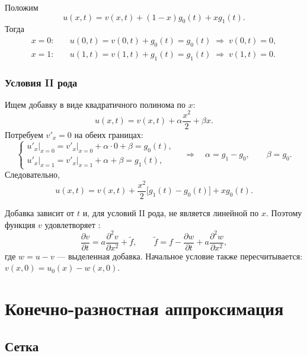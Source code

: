 \documentclass[../final.tex]{subfiles}
\begin{document}
Положим
\begin{equation*}
    u(x,t)=v(x,t)+(1-x)g_0(t)+xg_1(t).
\end{equation*}
Тогда
\begin{align*}
    x=0:&\quad u(0,t)=v(0,t)+g_0(t)=g_0(t)
    \;\Longrightarrow\; v(0,t)=0,\\
    x=1:&\quad u(1,t)=v(1,t)+g_1(t)=g_1(t)
    \;\Longrightarrow\; v(1,t)=0.
\end{align*}

\subsubsection{Условия II рода}

Ищем добавку в виде квадратичного полинома по $x$:
\begin{equation*}
    u(x,t)=v(x,t)+\alpha\frac{x^2}{2}+\beta x.
\end{equation*}
Потребуем $v'_x=0$ на обеих границах:
\begin{equation*}
    \begin{cases}
        u'_x\big|_{x=0}=v'_x\big|_{x=0}+\alpha\cdot0+\beta=g_0(t),\\
        u'_x\big|_{x=1}=v'_x\big|_{x=1}+\alpha+\beta=g_1(t),
    \end{cases}
    \quad\Longrightarrow\quad
    \alpha=g_1-g_0,\qquad\beta=g_0.
\end{equation*}
Следовательно,
\begin{equation*}
    u(x,t)=v(x,t)+\frac{x^2}{2}\bigl[g_1(t)-g_0(t)\bigr]+xg_0(t).
\end{equation*}

\remark
Добавка зависит от $t$ и, для условий II рода, не является линейной
по $x$. Поэтому функция $v$ удовлетворяет :
\begin{equation*}
    \frac{\partial v}{\partial t}=a\frac{\partial^2v}{\partial x^2}
    +\tilde f,\qquad
    \tilde f=f-\frac{\partial w}{\partial t}
    +a\frac{\partial^2w}{\partial x^2},
\end{equation*}
где $w=u-v$ --- выделенная добавка. Начальное условие также
пересчитывается: $v(x,0)=u_0(x)-w(x,0)$.

\section{Конечно-разностная аппроксимация}

\subsection{Сетка}
\end{document}
